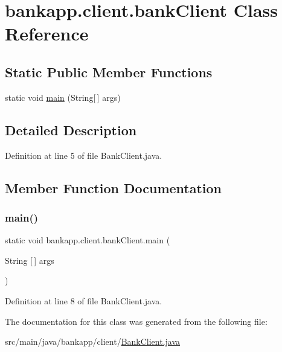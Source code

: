 \hypertarget{classbankapp_1_1client_1_1bank_client}{}\section{bankapp.\+client.\+bank\+Client Class Reference}
\label{classbankapp_1_1client_1_1bank_client}
\subsection*{Static Public Member Functions}
\begin{DoxyCompactItemize}
\item 
static void \hyperlink{classbankapp_1_1client_1_1bank_client_ad22392d35ad10f91cc417f169b69ff7b}{main} (String\mbox{[}$\,$\mbox{]} args)
\end{DoxyCompactItemize}


\subsection{Detailed Description}


Definition at line 5 of file Bank\+Client.\+java.



\subsection{Member Function Documentation}
\mbox{\label{classbankapp_1_1client_1_1bank_client_ad22392d35ad10f91cc417f169b69ff7b}} 
\subsubsection{\texorpdfstring{main()}{main()}}
{\footnotesize\ttfamily static void bankapp.\+client.\+bank\+Client.\+main (\begin{DoxyParamCaption}\item[{String \mbox{[}$\,$\mbox{]}}]{args }\end{DoxyParamCaption})\hspace{0.3cm}{\ttfamily [static]}}



Definition at line 8 of file Bank\+Client.\+java.



The documentation for this class was generated from the following file\+:\begin{DoxyCompactItemize}
\item 
src/main/java/bankapp/client/\hyperlink{_bank_client_8java}{Bank\+Client.\+java}\end{DoxyCompactItemize}
